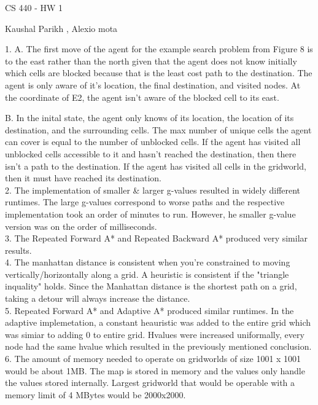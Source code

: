 \documentclass{article}
\begin{document}
\centerline{\sc \large CS 440 - HW 1}
\vspace{.5pc}
\centerline{\sc Kaushal Parikh , Alexio mota}
\vspace{2pc}

1. \setlength\parindent{3pc}  A. The first move of the agent for the example search problem from Figure 8 is to the east rather than the north given that the agent does not know initially which cells are blocked because that is the least cost path to the destination. The agent is only aware of it's location, the final destination, and visited nodes. At the coordinate of E2, the agent isn't aware of the blocked cell to its east. 

\setlength\parindent{3pc}  B.  In the inital state, the agent only knows of its location, the location of its destination, and the surrounding cells. The max number of unique cells the agent can cover is equal to the number of unblocked cells. If the agent has visited all unblocked cells accessible to it and hasn't reached the destination, then there isn't a path to the destination. If the agent has visited all cells in the gridworld, then it must have reached its destination.
\vspace{2pc}
\\
2. \setlength\parindent{3pc} The implementation of smaller \& larger g-values resulted in widely different runtimes. The large g-values correspond to worse paths and the respective implementation took an order of minutes to run. However, he smaller g-value version was on the order of milliseconds.
\vspace{2pc}
\\
3. \setlength\parindent{3pc}  The Repeated Forward A* and Repeated Backward A* produced very similar results.
\vspace{2pc}
\\
4. \setlength\parindent{3pc} The manhattan distance is consistent when you're constrained to moving vertically/horizontally along a grid. A heuristic is consistent if the "triangle inquality" holds. Since the Manhattan distance is the shortest path on a grid, taking a detour will always increase the distance.
\vspace{2pc}
\\
5. \setlength\parindent{3pc}  Repeated Forward A* and Adaptive A* produced similar runtimes. In the adaptive implemetation, a constant heauristic was added to the entire grid which was simiar to adding 0 to entire grid. Hvalues were increased uniformally, every node had the same hvalue which resulted in the previously mentioned conclusion.
\vspace{2pc}
\\
6. \setlength\parindent{3pc} The amount of memory needed to operate on gridworlds of size 1001 x 1001 would be about 1MB. The map is stored in memory and the values only handle the values stored internally. Largest gridworld that would be operable with a memory limit of 4 MBytes would be 2000x2000.
\vspace{2pc}
\\

\setlength\parindent{3pc}
\end{document}
